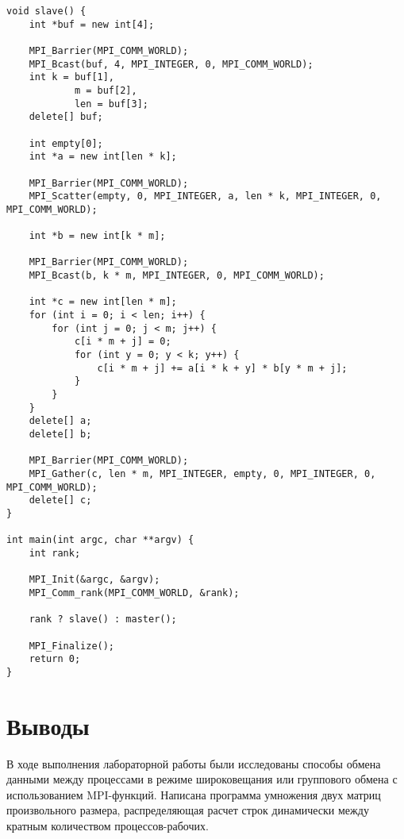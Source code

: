 \documentclass[a4paper,14pt]{extarticle}
\begin{document}
\begin{lstlisting}
void slave() { 
    int *buf = new int[4]; 
  
    MPI_Barrier(MPI_COMM_WORLD); 
    MPI_Bcast(buf, 4, MPI_INTEGER, 0, MPI_COMM_WORLD); 
    int k = buf[1], 
            m = buf[2], 
            len = buf[3]; 
    delete[] buf; 
  
    int empty[0]; 
    int *a = new int[len * k]; 
  
    MPI_Barrier(MPI_COMM_WORLD); 
    MPI_Scatter(empty, 0, MPI_INTEGER, a, len * k, MPI_INTEGER, 0, MPI_COMM_WORLD); 
  
    int *b = new int[k * m]; 
  
    MPI_Barrier(MPI_COMM_WORLD); 
    MPI_Bcast(b, k * m, MPI_INTEGER, 0, MPI_COMM_WORLD); 
  
    int *c = new int[len * m]; 
    for (int i = 0; i < len; i++) { 
        for (int j = 0; j < m; j++) { 
            c[i * m + j] = 0; 
            for (int y = 0; y < k; y++) { 
                c[i * m + j] += a[i * k + y] * b[y * m + j]; 
            } 
        } 
    } 
    delete[] a; 
    delete[] b; 
  
    MPI_Barrier(MPI_COMM_WORLD); 
    MPI_Gather(c, len * m, MPI_INTEGER, empty, 0, MPI_INTEGER, 0, MPI_COMM_WORLD); 
    delete[] c; 
} 

int main(int argc, char **argv) { 
    int rank; 
  
    MPI_Init(&argc, &argv); 
    MPI_Comm_rank(MPI_COMM_WORLD, &rank); 
  
    rank ? slave() : master(); 
  
    MPI_Finalize(); 
    return 0; 
}
\end{lstlisting}

\section*{Выводы}
В ходе выполнения лабораторной работы были исследованы способы обмена данными
между процессами в режиме широковещания или группового обмена с использованием
MPI-функций. Написана программа умножения двух матриц произвольного размера,
распределяющая расчет строк динамически между кратным количеством процессов-рабочих.
\end{document}
